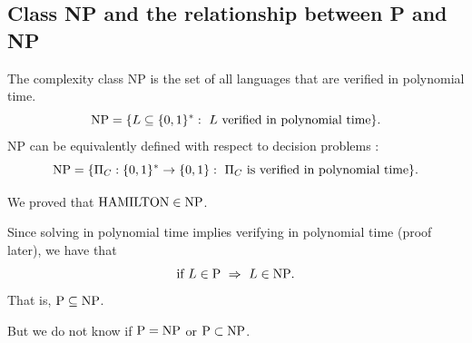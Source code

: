 \subsection{Class NP and the relationship between P and NP}

\begin{notesdefinition}
The complexity class NP is the set of all languages that are verified in polynomial time.
\[
\mathrm{NP}=\{L\subseteq\{0,1\}^*:\ L\text{ verified in polynomial time}\}.
\]
NP can be equivalently defined with respect to decision problems : 
\[
\mathrm{NP}=\{\Pi_C:\{0,1\}^*\to\{0,1\}:\ \Pi_C\text{ is verified in polynomial time}\}.
\]
\end{notesdefinition}

We proved that $\mathrm{HAMILTON}\in\mathrm{NP}$.

Since solving in polynomial time implies verifying in polynomial time (proof later), we have that 
\[
\text{if }L\in\mathrm{P}\ \Rightarrow\ L\in\mathrm{NP}.
\]
That is, $\mathrm{P}\subseteq\mathrm{NP}$.

But we do not know if $\mathrm{P}=\mathrm{NP}$ or $\mathrm{P}\subset\mathrm{NP}$.
